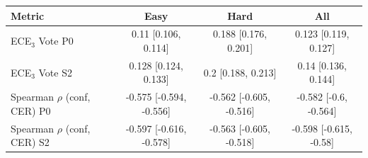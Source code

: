 \begin{tabular}{lccc}
\toprule
Metric & Easy & Hard & All \\
\midrule
ECE$_3$ Vote P0 & 0.11 [0.106, 0.114] & 0.188 [0.176, 0.201] & 0.123 [0.119, 0.127] \\
ECE$_3$ Vote S2 & 0.128 [0.124, 0.133] & 0.2 [0.188, 0.213] & 0.14 [0.136, 0.144] \\
Spearman $\rho$ (conf, CER) P0 & -0.575 [-0.594, -0.556] & -0.562 [-0.605, -0.516] & -0.582 [-0.6, -0.564] \\
Spearman $\rho$ (conf, CER) S2 & -0.597 [-0.616, -0.578] & -0.563 [-0.605, -0.518] & -0.598 [-0.615, -0.58] \\
\bottomrule
\end{tabular}
